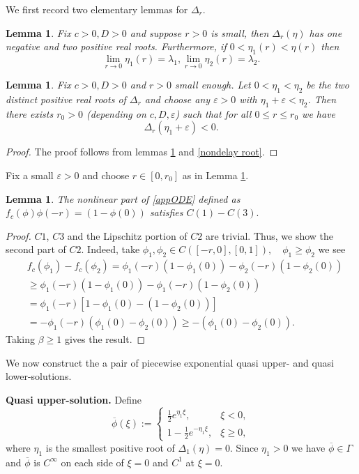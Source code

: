 \documentclass[12pt,letterpaper]{amsart}
\newtheorem{lemma}[theorem]{Lemma}
\theoremstyle{definition}
\theoremstyle{remark}
\numberwithin{equation}{section}
\begin{document}
 We first record two elementary  lemmas for $\Delta_r$.

 \begin{lemma}\label{root1}
 Fix $c>0, D>0$ and suppose $r>0$ is small, then $\Delta_r(\eta)$ has one negative and two positive real roots. Furthermore, if $0<\eta_1(r) <\eta(r)$ then 
 \[\lim_{r\to 0}\eta_1(r)=\lambda_1, \lim_{r\to 0}\eta_2(r)=\lambda_2.\]
 \end{lemma}
 
 \begin{lemma}\label{lem:continuity_r}
 	Fix $c>0, D>0$ and $r>0$ small enough. Let $ 0<\eta_1<\eta_2$ be the two distinct positive real roots of $\Delta_r$ and choose any $\varepsilon>0$ with $\eta_1+\varepsilon<\eta_2$. Then there exists $r_0>0$ (depending on $c,D,\varepsilon$) such that for all $0\le r\le r_0$ we have
 	\[
 	\Delta_r(\eta_1+\varepsilon)<0.
 	\]
 \end{lemma}
 
 \begin{proof} 
 	The proof follows from lemmas \ref{root1} and \ref{nondelay root}. 
 \end{proof}
 
 Fix a small $\varepsilon>0$ and choose $r\in[0,r_0]$ as in Lemma \ref{lem:continuity_r}.

 \begin{lemma}
The nonlinear part of   \eqref{appODE} defined as $f_c(\phi)\phi(-r)=\left(1-\phi(0)\right)$ satisfies $C(1)-C(3).$    
 \end{lemma}
 \begin{proof} $C1$, $C3$ and the Lipschitz portion of $C2$ are trivial. Thus, we show the second part of $C2$. Indeed, take $\phi_1, \phi_2 \in C([-r,0], [0,1]), \quad \phi_1\ge \phi_2$ we see 
 \[\begin{split}
 & f_c(\phi_1)-f_c(\phi_2)=\phi_1(-r)\left(1-\phi_1(0)\right)-\phi_2(-r)\left(1-\phi_2(0)\right)  \\
 &\ge \phi_1(-r)\left(1-\phi_1(0)\right)-\phi_1(-r)\left(1-\phi_2(0)\right)\\
 &=\phi_1(-r)\left[1-\phi_1(0)-\left(1-\phi_2(0)\right)\right]\\
 &=-\phi_1(-r)\left(\phi_1(0)-\phi_2(0)\right)\ge -\left(\phi_1(0)-\phi_2(0)\right).
 \end{split}\]
 Taking $\beta\ge 1$ gives the result. 
 \end{proof}
 We now construct the a pair of piecewise exponential quasi upper- and quasi lower-solutions.
 
 \medskip\noindent
 \textbf{Quasi upper-solution.} Define
 \[
 \overline{\phi}(\xi):=
 \begin{cases}
 	\frac{1}{2}e^{\eta_1 \xi}, & \xi<0,\\[4pt]
 	1-\frac{1}{2}e^{-\eta_1 \xi}, & \xi\ge0,
 \end{cases}
 \]
 where $\eta_1$ is the smallest positive root of $\Delta_1(\eta)=0$. Since $\eta_1>0$ we have $\overline\phi\in\Gamma$ and $\overline\phi$ is $C^\infty$ on each side of $\xi=0$ and $C^1$ at  $\xi=0$.
 
\end{document}
